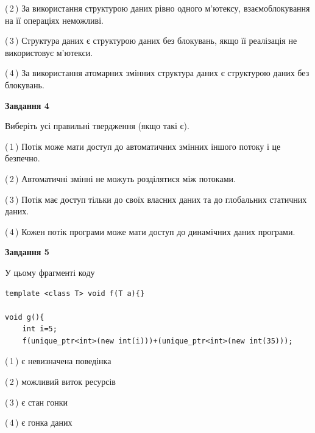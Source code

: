\documentclass[12pt, ukrainian]{article}
\begin{document}
\begin {large}
{(\,2\,) За використання структурою даних рівно одного м’ютексу, взаємоблокування на її операціях неможливі.%

(\,3\,) Структура даних є структурою даних без блокувань, якщо її реалізація не використовує м’ютекси.%

(\,4\,) За використання атомарних змінних структура даних є структурою даних без блокувань.%



\begin{center}
\textbf{Завдання 4}
\end{center}
Виберіть усі правильні твердження (якщо такі є).\par
\vspace{2mm}

(\,1\,) Потік може мати доступ до автоматичних змінних іншого потоку і це безпечно.%

(\,2\,) Автоматичні змінні не можуть розділятися між потоками.%

(\,3\,) Потік має доступ тільки до своїх власних даних та до глобальних статичних даних.%

(\,4\,) Кожен потік програми може мати доступ до динамічних даних програми.%



\begin{center}
\textbf{Завдання 5}
\end{center}
У цьому фрагменті коду
\begin{verbatim}
template <class T> void f(T a){}

void g(){
    int i=5;
    f(unique_ptr<int>(new int(i)))+(unique_ptr<int>(new int(35)));
\end{verbatim}
(\,1\,) є невизначена поведінка%

(\,2\,) можливий виток ресурсів%

(\,3\,) є стан гонки%

(\,4\,) є гонка даних%


}
\end {large}
\end{document}
